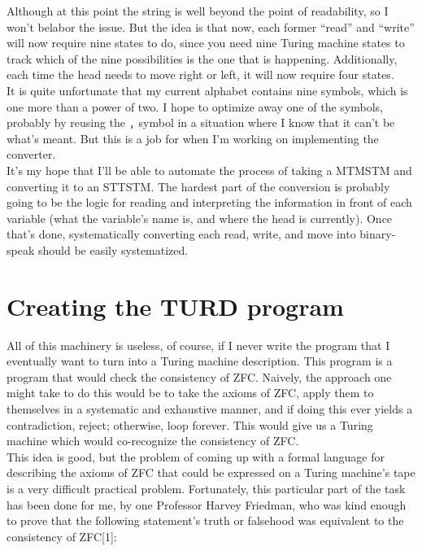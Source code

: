 \documentclass{article}
\begin{document}
Although at this point the string is well beyond the point of readability, so I won't belabor the issue. But the idea is that now, each former ``read'' and ``write'' will now require nine states to do, since you need nine Turing machine states to track which of the nine possibilities is the one that is happening. Additionally, each time the head needs to move right or left, it will now require four states. \\

It is quite unfortunate that my current alphabet contains nine symbols, which is one more than a power of two. I hope to optimize away one of the symbols, probably by reusing the \texttt{,} symbol in a situation where I know that it can't be what's meant. But this is a job for when I'm working on implementing the converter. \\

It's my hope that I'll be able to automate the process of taking a MTMSTM and converting it to an STTSTM. The hardest part of the conversion is probably going to be the logic for reading and interpreting the information in front of each variable (what the variable's name is, and where the head is currently). Once that's done, systematically converting each read, write, and move into binary-speak should be easily systematized.

\section{Creating the TURD program}

All of this machinery is useless, of course, if I never write the program that I eventually want to turn into a Turing machine description. This program is a program that would check the consistency of ZFC. Naively, the approach one might take to do this would be to take the axioms of ZFC, apply them to themselves in a systematic and exhaustive manner, and if doing this ever yields a contradiction, reject; otherwise, loop forever. This would give us a Turing machine which would co-recognize the consistency of ZFC. \\

This idea is good, but the problem of coming up with a formal language for describing the axioms of ZFC that could be expressed on a Turing machine's tape is a very difficult practical problem. Fortunately, this particular part of the task has been done for me, by one Professor Harvey Friedman, who was kind enough to prove that the following statement's truth or falsehood was equivalent to the consistency of ZFC[1]: \\
\end{document}
